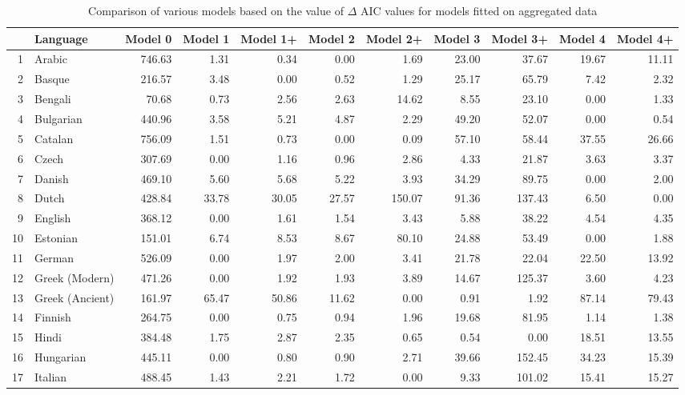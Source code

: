 \documentclass[a4paper]{article}
\begin{document}
\pagestyle{empty}
\begin{table}
	\caption{Comparison of various models based on the value of $\Delta$ AIC values for models fitted on aggregated data} \label{table:NSFAccuDivBG}%
	\centering
	\begin{tabular}{rlrrrrrrrrr}
		\hline
		& Language & Model 0 & Model 1 & Model 1+ & Model 2 & Model 2+ & Model 3 & Model 3+ & Model 4 & Model 4+ \\ 
		\hline
		1 & Arabic & 746.63 & 1.31 & 0.34 & 0.00 & 1.69 & 23.00 & 37.67 & 19.67 & 11.11 \\ 
		2 & Basque & 216.57 & 3.48 & 0.00 & 0.52 & 1.29 & 25.17 & 65.79 & 7.42 & 2.32 \\ 
		3 & Bengali & 70.68 & 0.73 & 2.56 & 2.63 & 14.62 & 8.55 & 23.10 & 0.00 & 1.33 \\ 
		4 & Bulgarian & 440.96 & 3.58 & 5.21 & 4.87 & 2.29 & 49.20 & 52.07 & 0.00 & 0.54 \\ 
		5 & Catalan & 756.09 & 1.51 & 0.73 & 0.00 & 0.09 & 57.10 & 58.44 & 37.55 & 26.66 \\ 
		6 & Czech & 307.69 & 0.00 & 1.16 & 0.96 & 2.86 & 4.33 & 21.87 & 3.63 & 3.37 \\ 
		7 & Danish & 469.10 & 5.60 & 5.68 & 5.22 & 3.93 & 34.29 & 89.75 & 0.00 & 2.00 \\ 
		8 & Dutch & 428.84 & 33.78 & 30.05 & 27.57 & 150.07 & 91.36 & 137.43 & 6.50 & 0.00 \\ 
		9 & English & 368.12 & 0.00 & 1.61 & 1.54 & 3.43 & 5.88 & 38.22 & 4.54 & 4.35 \\ 
		10 & Estonian & 151.01 & 6.74 & 8.53 & 8.67 & 80.10 & 24.88 & 53.49 & 0.00 & 1.88 \\ 
		11 & German & 526.09 & 0.00 & 1.97 & 2.00 & 3.41 & 21.78 & 22.04 & 22.50 & 13.92 \\ 
		12 & Greek (Modern) & 471.26 & 0.00 & 1.92 & 1.93 & 3.89 & 14.67 & 125.37 & 3.60 & 4.23 \\ 
		13 & Greek (Ancient) & 161.97 & 65.47 & 50.86 & 11.62 & 0.00 & 0.91 & 1.92 & 87.14 & 79.43 \\ 
		14 & Finnish & 264.75 & 0.00 & 0.75 & 0.94 & 1.96 & 19.68 & 81.95 & 1.14 & 1.38 \\ 
		15 & Hindi & 384.48 & 1.75 & 2.87 & 2.35 & 0.65 & 0.54 & 0.00 & 18.51 & 13.55 \\ 
		16 & Hungarian & 445.11 & 0.00 & 0.80 & 0.90 & 2.71 & 39.66 & 152.45 & 34.23 & 15.39 \\ 
		17 & Italian & 488.45 & 1.43 & 2.21 & 1.72 & 0.00 & 9.33 & 101.02 & 15.41 & 15.27 \\ 

\end{tabular}
\end{table}
\end{document}
